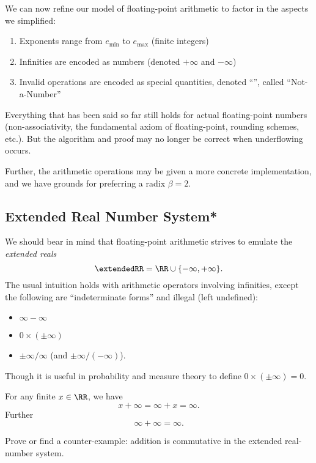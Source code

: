 We can now refine our model of floating-point arithmetic to factor in
the aspects we simplified:
\begin{enumerate}
\item Exponents range from $e_{\text{min}}$ to $e_{\text{max}}$ (finite integers)
\item Infinities are encoded as numbers (denoted $+\infty$ and $-\infty$)
\item Invalid operations are encoded as special quantities, denoted
  ``\NaN'', called ``Not-a-Number''
\end{enumerate}
Everything that has been said so far still holds for actual 
floating-point numbers (non-associativity, the fundamental axiom of
floating-point, rounding schemes, etc.). But the algorithm and proof may
no longer be correct when underflowing occurs.

Further, the arithmetic operations may be given a more concrete
implementation, and we have grounds for preferring a radix $\beta=2$.

\subsection{Extended Real Number System*}\label{subsec:computer:extended-real-number-system}

We should bear in mind that  floating-point arithmetic strives
to emulate the \emph{extended reals}
\begin{equation}
  \extendedRR = \RR\cup\{-\infty,+\infty\}.
\end{equation}
The usual intuition holds with arithmetic operators involving
infinities, except the following are ``indeterminate forms'' and illegal
(left undefined):
\begin{itemize}
\item $\infty-\infty$
\item $0\times(\pm\infty)$
\item $\pm\infty/\infty$ (and $\pm\infty/(-\infty)$).
\end{itemize}
Though it is useful in probability and measure theory to define
$0\times(\pm\infty)=0$.

\begin{axiom}[Addition]
  For any finite $x\in\RR$, we have
  $$x+\infty=\infty+x=\infty.$$
  Further
  $$\infty+\infty=\infty.$$
\end{axiom}


\begin{xca}
  Prove or find a counter-example: addition is commutative in the
  extended real-number system.
\end{xca}


